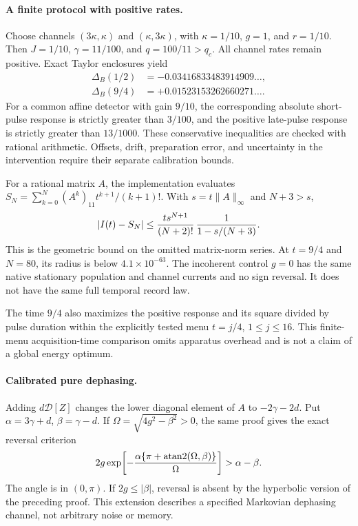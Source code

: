 \paragraph{A finite protocol with positive rates.}
Choose channels $(3\kappa,\kappa)$ and $(\kappa,3\kappa)$, with
$\kappa=1/10$, $g=1$, and $r=1/10$. Then $J=1/10$,
$\gamma=11/100$, and $q=100/11>q_c$. All channel rates remain positive.
Exact Taylor enclosures yield
\begin{align}
 \Delta_B(1/2)&=-0.03416833483914909\ldots,\\
 \Delta_B(9/4)&=+0.01523153262660271\ldots.
\end{align}
For a common affine detector with gain $9/10$, the corresponding absolute
short-pulse response is strictly greater than $3/100$, and the positive
late-pulse response is strictly greater than $13/1000$. These conservative
inequalities are checked with rational arithmetic. Offsets, drift,
preparation error, and uncertainty in the intervention require their separate
calibration bounds.

For a rational matrix $A$, the implementation evaluates
$S_N=\sum_{k=0}^N(A^k)_{11}t^{k+1}/(k+1)!$. With
$s=t\|A\|_\infty$ and $N+3>s$,
\begin{equation}
 |I(t)-S_N|\le
 {t s^{N+1}\over(N+2)!}\,{1\over1-s/(N+3)}.
\end{equation}
This is the geometric bound on the omitted matrix-norm series. At $t=9/4$
and $N=80$, its radius is below $4.1\times10^{-63}$. The incoherent control
$g=0$ has the same native stationary population and channel currents and no
sign reversal. It does not have the same full temporal record law.

The time $9/4$ also maximizes the positive response and its square divided by
pulse duration within the explicitly tested menu $t=j/4$, $1\le j\le16$.
This finite-menu acquisition-time comparison omits apparatus overhead and is
not a claim of a global energy optimum.

\paragraph{Calibrated pure dephasing.}
Adding $d\mathcal D[Z]$ changes the lower diagonal element of $A$ to
$-2\gamma-2d$. Put $\alpha=3\gamma+d$, $\beta=\gamma-d$. If
$\Omega=\sqrt{4g^2-\beta^2}>0$, the same proof gives the exact reversal
criterion
\begin{equation}
 2g\exp\!\left[-{\alpha\{\pi+\operatorname{atan2}(\Omega,\beta)\}
                         \over\Omega}\right]>\alpha-\beta.
\end{equation}
The angle is in $(0,\pi)$. If $2g\le|\beta|$, reversal is absent by
the hyperbolic version of the preceding proof. This extension describes a
specified Markovian dephasing channel, not arbitrary noise or memory.
